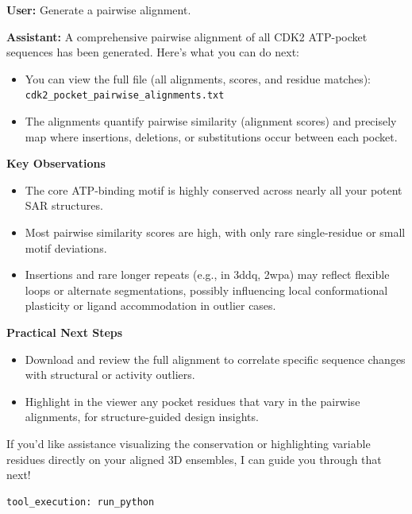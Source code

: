 \documentclass{article}
\begin{document}
\vspace{1.5em}

\begin{userbox}
\textbf{User:} Generate a pairwise alignment.
\end{userbox}

\begin{assistantbox}
\textbf{Assistant:} A comprehensive pairwise alignment of all CDK2 ATP-pocket sequences has been generated. Here’s what you can do next:
\begin{itemize}
    \item You can view the full file (all alignments, scores, and residue matches):\\
    \texttt{cdk2\_pocket\_pairwise\_alignments.txt}
    \item The alignments quantify pairwise similarity (alignment scores) and precisely map where insertions, deletions, or substitutions occur between each pocket.
\end{itemize}

\textbf{Key Observations}
\begin{itemize}
    \item The core ATP-binding motif is highly conserved across nearly all your potent SAR structures.
    \item Most pairwise similarity scores are high, with only rare single-residue or small motif deviations.
    \item Insertions and rare longer repeats (e.g., in 3ddq, 2wpa) may reflect flexible loops or alternate segmentations, possibly influencing local conformational plasticity or ligand accommodation in outlier cases.
\end{itemize}

\textbf{Practical Next Steps}
\begin{itemize}
    \item Download and review the full alignment to correlate specific sequence changes with structural or activity outliers.
    \item Highlight in the viewer any pocket residues that vary in the pairwise alignments, for structure-guided design insights.
\end{itemize}

If you'd like assistance visualizing the conservation or highlighting variable residues directly on your aligned 3D ensembles, I can guide you through that next!
\begin{verbatim}
tool_execution: run_python
\end{verbatim}
\end{assistantbox}
\end{document}

